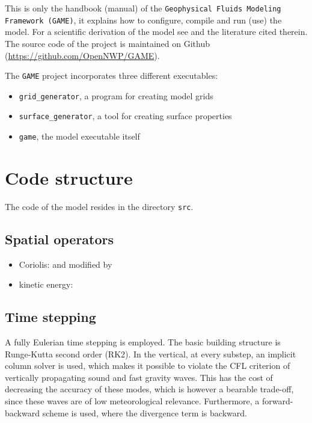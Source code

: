 \documentclass[10pt]{report}
\begin{document}
This is only the handbook (manual) of the \texttt{Geophysical Fluids Modeling Framework (GAME)}, it explains how to configure, compile and run (use) the model. For a scientific derivation of the model see \cite{kompendium} and the literature cited therein. The source code of the project is maintained on Github (\url{https://github.com/OpenNWP/GAME}).

The \texttt{GAME} project incorporates three different executables:

\begin{itemize}
\item \texttt{grid\_generator}, a program for creating model grids
\item \texttt{surface\_generator}, a tool for creating surface properties
\item \texttt{game}, the model executable itself
\end{itemize}

\chapter{Code structure}
\label{chap:code_structure}

The code of the model resides in the directory \texttt{src}.

\section{Spatial operators}
\label{sec:spatial_operators}

\begin{itemize}
\item Coriolis: \cite{thuburn_f_discrete_plane} and \cite{ringler_trsk} modified by \cite{doi:10.1002/qj.3294}
\item kinetic energy: \cite{doi:10.1002/qj.1960}
\end{itemize}

\section{Time stepping}
\label{sec:time_stepping}

A fully Eulerian time stepping is employed. The basic building structure is Runge-Kutta second order (RK2). In the vertical, at every substep, an implicit column solver is used, which makes it possible to violate the CFL criterion of vertically propagating sound and fast gravity waves. This has the cost of decreasing the accuracy of these modes, which is however a bearable trade-off, since these waves are of low meteorological relevance. Furthermore, a forward-backward scheme is used, where the divergence term is backward.
\end{document}
